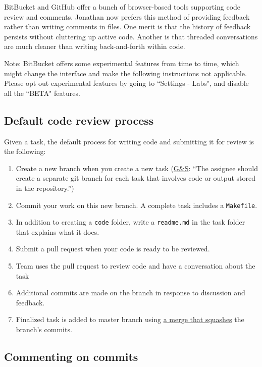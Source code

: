 BitBucket and GitHub offer a bunch of browser-based tools supporting code review and comments. 
Jonathan now prefers this method of providing feedback rather than writing comments in files.
One merit is that the history of feedback persists without cluttering up active code.
Another is that threaded conversations are much cleaner than writing back-and-forth within code.

Note: BitBucket offers some experimental features from time to time, 
which might change the interface and make the following instructions not applicable. 
Please opt out experimental features by going to ``Settings - Labs", 
and disable all the ``BETA" features.

\subsection{Default code review process}\label{code_review_process}
Given a task, the default process for writing code and submitting it for review is the following:
\begin{enumerate}
\item Create a new branch when you create a new task (\href{https://github.com/gslab-econ/ra-manual/wiki/Tasks}{G\&S}: ``The assignee should create a separate git branch for each task that involves code or output stored in the repository.'')
\item Commit your work on this new branch. A complete task includes a \texttt{Makefile}.
\item In addition to creating a \texttt{code} folder, write a \texttt{readme.md} in the task folder that explains what it does.
\item Submit a pull request when your code is ready to be reviewed.
\item Team uses the pull request to review code and have a conversation about the task
\item Additional commits are made on the branch in response to discussion and feedback.
\item Finalized task is added to master branch using \href{https://bitbucket.org/blog/git-squash-commits-merging-bitbucket}{a merge that squashes} the branch's commits.
\end{enumerate}


\subsection{Commenting on commits}


